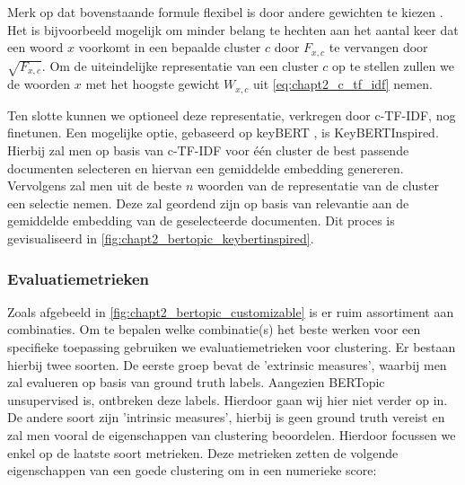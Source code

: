 Merk op dat bovenstaande formule flexibel is door andere gewichten te kiezen \cite{bertopic_c_tf_idf}. Het is bijvoorbeeld mogelijk om minder belang te hechten aan het aantal keer dat een woord $x$ voorkomt in een bepaalde cluster $c$ door $F_{x,c}$ te vervangen door $\sqrt{F_{x,c}}$. Om de uiteindelijke representatie van een cluster $c$ op te stellen zullen we de woorden $x$ met het hoogste gewicht $W_{x,c}$ uit \autoref{eq:chapt2_c_tf_idf} nemen.


Ten slotte kunnen we optioneel deze representatie, verkregen door c-TF-IDF, nog finetunen. Een mogelijke optie, gebaseerd op keyBERT \cite{keybert}, is KeyBERTInspired. Hierbij zal men op basis van c-TF-IDF voor één cluster de best passende documenten selecteren en hiervan een gemiddelde embedding genereren. Vervolgens zal men uit de beste $n$ woorden van de representatie van de cluster een selectie nemen. Deze zal geordend zijn op basis van relevantie aan de gemiddelde embedding van de geselecteerde documenten. Dit proces is gevisualiseerd in \autoref{fig:chapt2_bertopic_keybertinspired}.




\subsubsection{Evaluatiemetrieken}
\label{sec:chapt2_clustering_evaluation}
Zoals afgebeeld in \autoref{fig:chapt2_bertopic_customizable} is er ruim assortiment aan combinaties. Om te bepalen welke combinatie(s) het beste werken voor een specifieke toepassing gebruiken we evaluatiemetrieken voor clustering. Er bestaan hierbij twee soorten. \cite{eval_metrics_scikit,eval_metrics} De eerste groep bevat de 'extrinsic measures', waarbij men zal evalueren op basis van ground truth labels. Aangezien BERTopic unsupervised is, ontbreken deze labels. Hierdoor gaan wij hier niet verder op in. De andere soort zijn 'intrinsic measures', hierbij is geen ground truth vereist en zal men vooral de eigenschappen van clustering beoordelen.  Hierdoor focussen  we enkel op de laatste soort metrieken. Deze metrieken zetten de volgende eigenschappen van een goede clustering om in een numerieke score:

